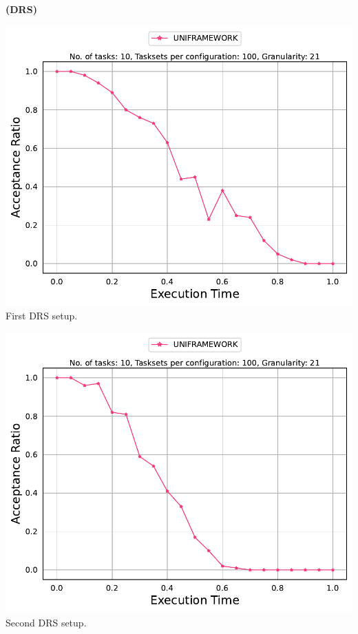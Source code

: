 \documentclass[]{article}
\begin{document}
	\begin{minipage}[t]{0.48\linewidth}
		\centering
		\textbf{(DRS)}
		\vspace{0.3cm}
		
		\includegraphics[width=\linewidth]{UNIFRAMEWORK_1stSetup_DRS.pdf}
		First DRS setup.
		\vspace{0.3cm}
		
		\includegraphics[width=\linewidth]{UNIFRAMEWORK_2ndSetup_DRS.pdf}
		Second DRS setup.
		\vspace{0.3cm}
		

\end{minipage}
\end{document}

